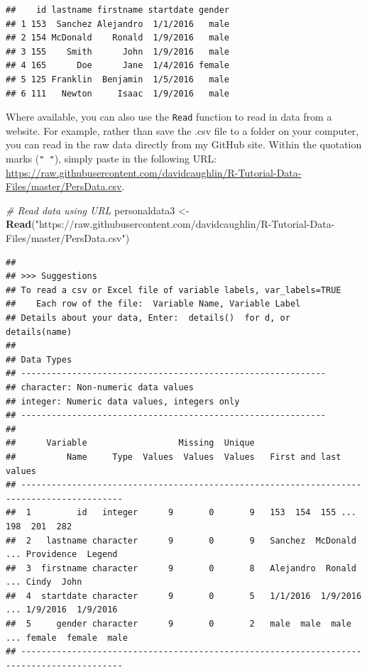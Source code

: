 \documentclass[]{book}
\newenvironment{Shaded}{\begin{snugshade}}{\end{snugshade}}
\newcommand{\KeywordTok}[1]{\textcolor[rgb]{0.13,0.29,0.53}{\textbf{#1}}}
\newcommand{\StringTok}[1]{\textcolor[rgb]{0.31,0.60,0.02}{#1}}
\newcommand{\CommentTok}[1]{\textcolor[rgb]{0.56,0.35,0.01}{\textit{#1}}}
\newcommand{\NormalTok}[1]{#1}
\begin{document}
\begin{verbatim}
##    id lastname firstname startdate gender
## 1 153  Sanchez Alejandro  1/1/2016   male
## 2 154 McDonald    Ronald  1/9/2016   male
## 3 155    Smith      John  1/9/2016   male
## 4 165      Doe      Jane  1/4/2016 female
## 5 125 Franklin  Benjamin  1/5/2016   male
## 6 111   Newton     Isaac  1/9/2016   male
\end{verbatim}

Where available, you can also use the \texttt{Read} function to read in
data from a website. For example, rather than save the .csv file to a
folder on your computer, you can read in the raw data directly from my
GitHub site. Within the quotation marks (\texttt{"\ "}), simply paste in
the following URL:
\url{https://raw.githubusercontent.com/davidcaughlin/R-Tutorial-Data-Files/master/PersData.csv}.

\begin{Shaded}
\begin{Highlighting}[]
\CommentTok{# Read data using URL}
\NormalTok{personaldata3 <-}\StringTok{ }\KeywordTok{Read}\NormalTok{(}\StringTok{"https://raw.githubusercontent.com/davidcaughlin/R-Tutorial-Data-Files/master/PersData.csv"}\NormalTok{)}
\end{Highlighting}
\end{Shaded}

\begin{verbatim}
## 
## >>> Suggestions
## To read a csv or Excel file of variable labels, var_labels=TRUE
##    Each row of the file:  Variable Name, Variable Label
## Details about your data, Enter:  details()  for d, or  details(name)
## 
## Data Types
## ------------------------------------------------------------
## character: Non-numeric data values
## integer: Numeric data values, integers only
## ------------------------------------------------------------
## 
##      Variable                  Missing  Unique 
##          Name     Type  Values  Values  Values   First and last values
## ------------------------------------------------------------------------------------------
##  1         id   integer      9       0       9   153  154  155 ... 198  201  282
##  2   lastname character      9       0       9   Sanchez  McDonald ... Providence  Legend
##  3  firstname character      9       0       8   Alejandro  Ronald ... Cindy  John
##  4  startdate character      9       0       5   1/1/2016  1/9/2016 ... 1/9/2016  1/9/2016
##  5     gender character      9       0       2   male  male  male ... female  female  male
## ------------------------------------------------------------------------------------------
\end{verbatim}
\end{document}
